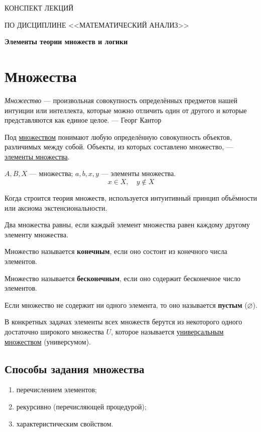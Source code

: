 \documentclass[a4paper, 12pt]{article}
\begin{document}
\begin{center}
{\large КОНСПЕКТ ЛЕКЦИЙ}

ПО ДИСЦИПЛИНЕ <<МАТЕМАТИЧЕСКИЙ АНАЛИЗ>>

\vspace{5pt}
\textbf{Элементы теории множеств и логики}
\end{center}
\vspace{10pt}

\section*{Множества}

\emph{Множество} --- произвольная совокупность определённых предметов нашей
интуиции или интеллекта, которые можно отличить один от другого и которые
представляются как единое целое.
\hfill --- Георг Кантор

Под \underline{множеством} понимают любую определённую совокупность объектов,
различимых между собой. Объекты, из которых составлено множество, ---
\underline{элементы множества}.

$A, B, X$ --- множества; \quad $a, b, x, y$ --- элементы множества.
\[
  \boxed{x \in X, \quad y \notin X}
\]

Когда строится теория множеств, используется интуитивный принцип объёмности
или аксиома экстенсиональности.

Два множества равны, если каждый элемент множества равен каждому другому
элементу множества.

Множество называется \textbf{конечным}, если оно состоит из конечного числа
элементов.

Множество называется \textbf{бесконечным}, если оно содержит бесконечное число
элементов.

Если множество не содержит ни одного элемента, то оно называется
\textbf{пустым} ($\varnothing$).

В конкретных задачах элементы всех множеств берутся из некоторого одного
достаточно широкого множества $U$, которое называется
\underline{универсальным} \underline{множеством} (универсумом).

\subsection*{Способы задания множества}

\begin{enumerate}[noitemsep]
  \item перечислением элементов;
  \item рекурсивно (перечисляющей процедурой);
  \item характеристическим свойством.
\end{enumerate}
\end{document}
